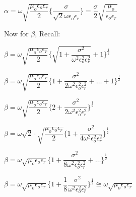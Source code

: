 \begin{center}
$\alpha = \omega\sqrt{\dfrac{\mu_{o}\epsilon_{o}\epsilon_{r}}{2}}\Bigg\{\dfrac{\sigma}{\sqrt{2}\omega\epsilon_{o}\epsilon_{r}}\Bigg\} =\dfrac{\sigma}{2}\sqrt{\dfrac{\mu_{o}}{\epsilon_{o}\epsilon_{r}}}$
\end{center}

Now for $\beta$, Recall:
\begin{center}
$\beta = \omega\sqrt{\dfrac{\mu_{o}\epsilon_{o}\epsilon_{r}}{2}}\Bigg\{{\sqrt{1 + \dfrac{\sigma^{2}}{\omega^{2}\epsilon_{o}^{2}\epsilon_{r}^{2}}}} + 1\Bigg\}^{\frac{1}{2}}$
\end{center}

\begin{center}
$\beta = \omega\sqrt{\dfrac{\mu_{o}\epsilon_{o}\epsilon_{r}}{2}}\Bigg\{1 + \dfrac{\sigma^{2}}{2\omega^{2}\epsilon_{o}^{2}\epsilon_{r}^{2}} + \dots + 1\Bigg\}^{\frac{1}{2}}$
\end{center}

\begin{center}
$\beta = \omega\sqrt{\dfrac{\mu_{o}\epsilon_{o}\epsilon_{r}}{2}}\Bigg\{2 + \dfrac{\sigma^{2}}{2\omega^{2}\epsilon_{o}^{2}\epsilon_{r}^{2}}\Bigg\}^{\frac{1}{2}}$
\end{center}

\begin{center}
$\beta = \omega\sqrt{2}\cdot\sqrt{\dfrac{\mu_{o}\epsilon_{o}\epsilon_{r}}{2}}\Bigg\{1 + \dfrac{\sigma^{2}}{4\omega^{2}\epsilon_{o}^{2}\epsilon_{r}^{2}}\Bigg\}^{\frac{1}{2}}$
\end{center}

\begin{center}
$\beta = \omega\sqrt{\mu_{o}\epsilon_{o}\epsilon_{r}}\Bigg\{1 + \dfrac{\sigma^{2}}{8\omega^{2}\epsilon_{o}^{2}\epsilon_{r}^{2}} + \dots\Bigg\}^{\frac{1}{2}}$
\end{center}


\begin{center}
$\beta = \omega\sqrt{\mu_{o}\epsilon_{o}\epsilon_{r}}\Bigg\{1 + \dfrac{1}{8} \dfrac{\sigma^{2}}{\omega^{2}\epsilon_{o}^{2}\epsilon_{r}^{2}}\Bigg\}^{\frac{1}{2}} \cong \omega\sqrt{\mu_{o}\epsilon_{o}\epsilon_{r}}$
\end{center}

